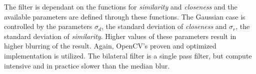 The filter is dependant on the functions for \emph{similarity} and \emph{closeness} and the available parameters are defined through these functions.
The Gaussian case is controlled by the parameters $\sigma_d$, the standard deviation of \emph{closeness} and $\sigma_r$, the standard deviation of \emph{similarity}.
Higher values of these parameters result in higher blurring of the result.
Again, OpenCV's\cite{opencv_library} proven and optimized implementation is utilized.
The bilateral filter is a single pass filter, but compute intensive and in practice slower than the median blur.
